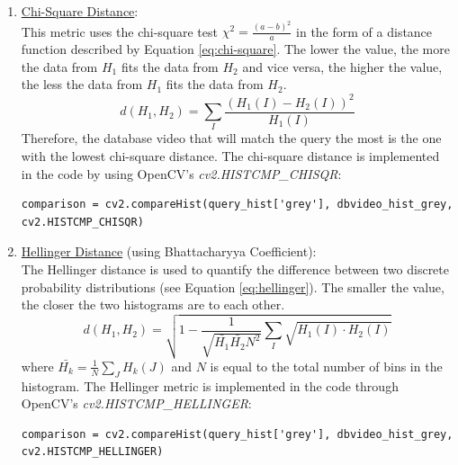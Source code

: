 \begin{enumerate}
    \item \underline{Chi-Square Distance}:\\ 
    This metric uses the chi-square test $\chi^2=\frac{(a-b)^2}{a}$ in the form of a distance function described by Equation \ref{eq:chi-square}. The lower the value, the more the data from $H_1$ fits the data from $H_2$ and vice versa, the higher the value, the less the data from $H_1$ fits the data from $H_2$.
    \begin{equation}
    \label{eq:chi-square}
        d(H_1,H_2)=\sum_I\frac{(H_1(I)-H_2(I))^2}{H_1(I)}
    \end{equation}
    Therefore, the database video that will match the query the most is the one with the lowest chi-square distance. The chi-square distance is implemented in the code by using OpenCV's \textit{cv2.HISTCMP\_CHISQR}:
\begin{lstlisting}
comparison = cv2.compareHist(query_hist['grey'], dbvideo_hist_grey, cv2.HISTCMP_CHISQR)
\end{lstlisting}

    
    \item \underline{Hellinger Distance} (using Bhattacharyya Coefficient):\\
    The Hellinger distance is used to quantify the difference between two discrete probability distributions (see Equation \ref{eq:hellinger}). The smaller the value, the closer the two histograms are to each other.
    \begin{equation}
    \label{eq:hellinger}
        d(H_1,H_2)=\sqrt{1-\frac{1}{\sqrt{\bar{H_1}\bar{H_2}N^2}}\sum_I\sqrt{H_1(I)\cdot H_2(I)}}
    \end{equation}
    where $\bar{H_k}=\frac{1}{N}\sum_JH_k(J)$ and $N$ is equal to the total number of bins in the histogram. The Hellinger metric is implemented in the code through OpenCV's \textit{cv2.HISTCMP\_HELLINGER}:
\begin{lstlisting}
comparison = cv2.compareHist(query_hist['grey'], dbvideo_hist_grey, cv2.HISTCMP_HELLINGER)
\end{lstlisting}


\end{enumerate}
